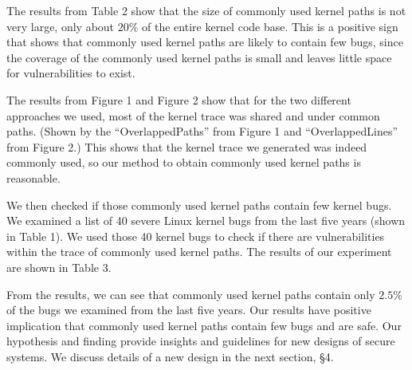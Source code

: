 The results from Table 2 show that the size of commonly used kernel paths is not very large, only about $20\%$ 
of the entire kernel code base. This is a positive sign that shows that commonly used kernel paths are likely to contain 
few bugs, since the coverage of the commonly used kernel paths is small and leaves little space for vulnerabilities to exist. 

The results from Figure 1 and Figure 2 show that for the two different approaches we used, most of the kernel trace was shared 
and under common paths. 
(Shown by the ``OverlappedPaths'' from Figure 1 and ``OverlappedLines'' from Figure 2.) 
This shows that the kernel trace we generated was indeed commonly used, 
so our method to obtain commonly used kernel paths is reasonable. 

We then checked if those commonly used kernel paths contain few kernel bugs.
We examined a list of 40 severe Linux kernel bugs from the last five years (shown in Table 1). 
We used those 40 kernel bugs to check if there are vulnerabilities within the trace of commonly used kernel paths.
The results of our experiment are shown in Table 3.  

From the results, we can see that commonly used kernel paths contain only $2.5\%$ of the bugs we examined 
from the last five years.  
Our results have positive implication that commonly used kernel paths
contain few bugs and are safe. 
Our hypothesis and finding provide insights and guidelines for new designs of secure systems. We discuss details of 
a new design in the next section, \S{4}. 
